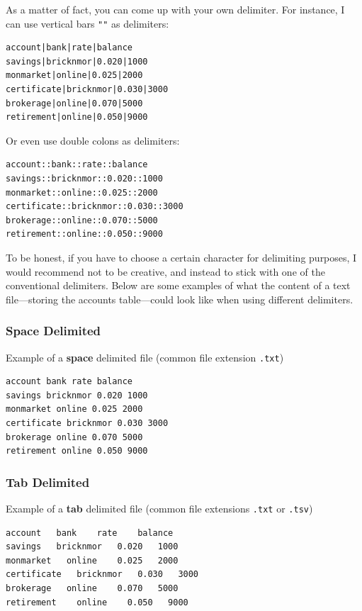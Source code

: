 \documentclass[
]{book}
\begin{document}
As a matter of fact, you can come up with your own delimiter. For instance,
I can use vertical bars \texttt{"\textbar{}"} as delimiters:

\begin{verbatim}
account|bank|rate|balance
savings|bricknmor|0.020|1000
monmarket|online|0.025|2000
certificate|bricknmor|0.030|3000
brokerage|online|0.070|5000
retirement|online|0.050|9000
\end{verbatim}

Or even use double colons as delimiters:

\begin{verbatim}
account::bank::rate::balance
savings::bricknmor::0.020::1000
monmarket::online::0.025::2000
certificate::bricknmor::0.030::3000
brokerage::online::0.070::5000
retirement::online::0.050::9000
\end{verbatim}

To be honest, if you have to choose a certain character for delimiting
purposes, I would recommend not to be creative, and instead to stick with one
of the conventional delimiters. Below are some examples of what the content of
a text file---storing the accounts table---could look like when using different
delimiters.

\hypertarget{space-delimited}{%
\subsubsection*{Space Delimited}\label{space-delimited}}

Example of a \textbf{space} delimited file (common file extension \texttt{.txt})

\begin{verbatim}
account bank rate balance
savings bricknmor 0.020 1000
monmarket online 0.025 2000
certificate bricknmor 0.030 3000
brokerage online 0.070 5000
retirement online 0.050 9000
\end{verbatim}

\hypertarget{tab-delimited}{%
\subsubsection*{Tab Delimited}\label{tab-delimited}}

Example of a \textbf{tab} delimited file (common file extensions \texttt{.txt} or \texttt{.tsv})

\begin{verbatim}
account   bank    rate    balance
savings   bricknmor   0.020   1000
monmarket   online    0.025   2000
certificate   bricknmor   0.030   3000
brokerage   online    0.070   5000
retirement    online    0.050   9000
\end{verbatim}
\end{document}

